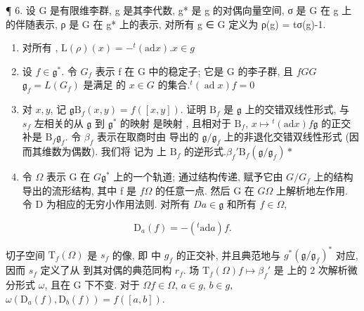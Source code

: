 ¶ 6. 设 G 是有限维李群, g 是其李代数, g* 是 g 的对偶向量空间, σ 是 G 在 g 上的伴随表示, ρ 是 G 在 g* 上的表示, 对所有 g ∈ G 定义为 ρ(g) = tσ(g)-1.

\begin{enumerate}
\def\labelenumi{(\alph{enumi})}
\item
  对所有 , \(\mathrm{L}(\rho)(x) = -^{t}(\mathrm{ad} x)\).\(x \in g\)
\item
  设 \(f \in \mathfrak{g}^*\). 令 \(G_f\) 表示 f 在 G 中的稳定子; 它是 G 的李子群, 且 \(f\)\(G\)\(G\)\(\mathfrak{g}_f = L(G_f)\) 是满足  的 \(x \in G\) 的集合.\({}^t (\operatorname{ad}x)f = 0\)
\item
  对 \(x, y\), 记 \(\mathfrak{g}\)\(\mathrm{B}_f(x, y) = f([x, y])\). 证明 \(\mathrm{B}_f\) 是 \(\mathfrak{g}\) 上的交错双线性形式, 与 \(s_f\) 左相关的从 \(\mathfrak{g}\) 到 \(\mathfrak{g}^*\) 的映射  是映射  , 且相对于 \(\mathrm{B}_f\), \(x \mapsto {}^t (\mathrm{ad}x)\)\(f\)\(\mathfrak{g}\) 的正交补是 \(\mathrm{B}_f\)\(\mathfrak{g}_f\). 令 \(\beta_f\) 表示在取商时由  导出的 \(\mathfrak{g} / \mathfrak{g}_f\) 上的非退化交错双线性形式 (因而其维数为偶数). 我们将  记为  上 \(\mathrm{B}_f\) 的逆形式.\(\beta_f'\)\(\mathrm{B}_f\)\((\mathfrak{g} / \mathfrak{g}_f)*\)
\item
  令 \(\Omega\) 表示 G 在 \(G\)\(\mathfrak{g}^*\) 上的一个轨道; 通过结构传递, 赋予它由 \(G / G_f\) 上的结构导出的流形结构, 其中 f 是 \(f\)\(\Omega\) 的任意一点. 然后 G 在 \(G\)\(\Omega\) 上解析地左作用. 令 D 为相应的无穷小作用法则. 对所有 \(D\)\(a \in \mathfrak{g}\) 和所有 \(f \in \Omega\),
\end{enumerate}

\[
\mathrm{D} _ {a} (f) = - (^ {t} \mathrm{ad} a) f.
\]

切子空间 \(\mathrm{T}_{f}(\Omega)\) 是 \(s_{f}\) 的像, 即  中 \(g_{f}\) 的正交补, 并且典范地与 \(g^{*}\)\((\mathfrak{g}/\mathfrak{g}_{f})^{*}\) 对应, 因而 \(s_{f}\) 定义了从  到其对偶的典范同构 \(r_{f}\). 场 \(\mathrm{T}_{f}(\Omega)\)\(f \mapsto \beta_{f}'\) 是  上的 2 次解析微分形式 \(\omega\), 且在 G 下不变. 对于 \(\Omega\)\(f \in \Omega\), \(a \in g\), \(b \in g\), \(\omega(\mathrm{D}_{a}(f), \mathrm{D}_{b}(f)) = f([a, b])\).

